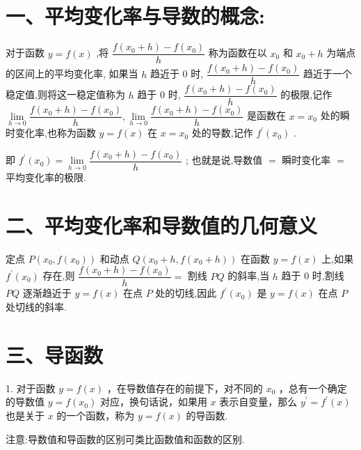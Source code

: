 \section*{一、平均变化率与导数的概念:}

对于函数 $y = f\left( x\right)$ ,将 $\dfrac{f\left( {{x}_{0} + h}\right)  - f\left( {x}_{0}\right) }{h}$ 称为函数在以 ${x}_{0}$ 和 ${x}_{0} + h$ 为端点的区间上的平均变化率, 如果当 $h$ 趋近于 0 时, $\dfrac{f\left( {{x}_{0} + h}\right)  - f\left( {x}_{0}\right) }{h}$ 趋近于一个稳定值,则将这一稳定值称为 $h$ 趋于 0 时, $\dfrac{f\left( {{x}_{0} + h}\right)  - f\left( {x}_{0}\right) }{h}$ 的极限,记作 $\mathop{\lim }\limits_{{h \rightarrow  0}}\dfrac{f\left( {{x}_{0} + h}\right)  - f\left( {x}_{0}\right) }{h},\mathop{\lim }\limits_{{h \rightarrow  0}}\dfrac{f\left( {{x}_{0} + h}\right)  - f\left( {x}_{0}\right) }{h}$ 是函数在 $x = {x}_{0}$ 处的瞬时变化率,也称为函数 $y = f\left( x\right)$ 在 $x = {x}_{0}$ 处的导数,记作 ${f}^{\prime }\left( {x}_{0}\right)$ .

即 ${f}^{\prime }\left( {x}_{0}\right)  = \mathop{\lim }\limits_{{h \rightarrow  0}}\dfrac{f\left( {{x}_{0} + h}\right)  - f\left( {x}_{0}\right) }{h}$ ; 也就是说,导数值 $=$ 瞬时变化率 $=$ 平均变化率的极限.

\section*{二、平均变化率和导数值的几何意义}

定点 $P\left( {{x}_{0},f\left( {x}_{0}\right) }\right)$ 和动点 $Q\left( {{x}_{0} + h,f\left( {{x}_{0} + h}\right) }\right)$ 在函数 $y = f\left( x\right)$ 上,如果 ${f}^{\prime }\left( {x}_{0}\right)$ 存在,则 $\dfrac{f\left( {{x}_{0} + h}\right)  - f\left( {x}_{0}\right) }{h} =$ 割线 ${PQ}$ 的斜率,当 $h$ 趋于 0 时,割线 ${PQ}$ 逐渐趋近于 $y = f\left( x\right)$ 在点 $P$ 处的切线,因此 ${f}^{\prime }\left( {x}_{0}\right)$ 是 $y = f\left( x\right)$ 在点 $P$ 处切线的斜率.

\section*{三、导函数}

1. 对于函数 $y = f\left( x\right)$ ，在导数值存在的前提下，对不同的 ${x}_{0}$ ，总有一个确定的导数值 $y = f\left( {x}_{0}\right)$ 对应，换句话说，如果用 $x$ 表示自变量，那么 ${y}^{\prime } = {f}^{\prime }\left( x\right)$ 也是关于 $x$ 的一个函数，称为 $y = f\left( x\right)$ 的导函数.

注意:导数值和导函数的区别可类比函数值和函数的区别.

